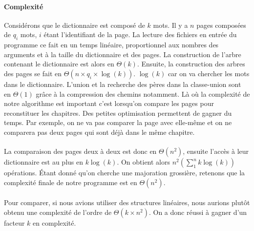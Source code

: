 \documentclass[a4paper]{article}
\begin{document}
		 	\paragraph{Complexité}{
		 	Considérons que le dictionnaire est composé de $k$ mots. Il y a $n$ pages composées de
		 	$q_{i}$ mots, $i$ étant l'identifiant de la page. \newline
		 	La lecture des fichiers en entrée du programme ce fait en un temps linéaire, proportionnel aux
		 	nombres des arguments et à la taille du dictionnaire et des pages. La construction de l'arbre
		 	contenant le dictionnaire est alors en $\Theta(k)$. \newline
		 	Ensuite, la construction des arbres des pages se fait en $\Theta(n \times q_{i} \times \log(k))$.
		 	$\log(k)$ car on va chercher les mots dans le dictionnaire.
		 	L'union et la recherche des pères dans la classe-union sont en $\Theta(1)$ grâce à la compression des
		 	chemins notamment. Là où la complexité de notre algorithme est important c'est lorsqu'on compare les pages
		 	pour reconstituer les chapitres. Des petites optimisation permettent de gagner du temps. Par exemple,
		 	on ne va pas comparer la page avec elle-même et on ne comparera pas deux pages qui sont déjà dans le
		 	même chapitre.
		 	}
		 	\paragraph{}{
		 	La comparaison des pages deux à deux est donc en $\Theta(n^{2})$, ensuite l'accès à leur
		 	dictionnaire est au plus en $k\log(k)$. On obtient alors $n^{2}( \sum_{1}^{n} k\log(k))$ opérations.
		 	Étant donné qu'on cherche une majoration grossière, retenons que la complexité finale de 
		 	notre programme est en $\Theta(n^{2})$.
		 	}
		 	\paragraph{}{
		 	Pour comparer, si nous avions utiliser des structures linéaires, nous aurions plutôt obtenu une
		 	complexité de l'ordre de $\Theta(k \times n^{2})$. On a donc réussi à gagner d'un facteur $k$
		 	en complexité.
		 	}
		 	
\end{document}
